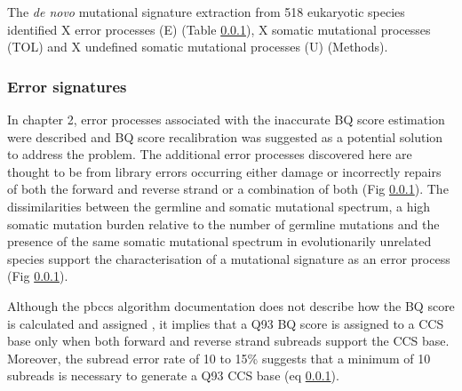 \begin{table}[h!]
\begin{adjustbox}{max width=1.1\textwidth,center}
\begin{tabular}{lllll}
\end{tabular}
\end{adjustbox} 
\end{table}

The \textit{de novo} mutational signature extraction from 518 eukaryotic species identified X error processes (E) (Table \ref{}), X somatic mutational processes (TOL) and X undefined somatic mutational processes (U) (Methods).


\subsubsection{Error signatures}

In chapter 2, error processes associated with the inaccurate BQ score estimation were described and BQ score recalibration was suggested as a potential solution to address the problem. The additional error processes discovered here are thought to be from library errors occurring either damage or incorrectly repairs of both the forward and reverse strand or a combination of both (Fig \ref{}). The dissimilarities between the germline and somatic mutational spectrum, a high somatic mutation burden relative to the number of germline mutations and the presence of the same somatic mutational spectrum in evolutionarily unrelated species support the characterisation of a mutational signature as an error process (Fig \ref{}). 

%

Although the pbccs algorithm documentation does not describe how the BQ score is calculated and assigned \cite{}, it implies that a Q93 BQ score is assigned to a CCS base only when both forward and reverse strand subreads support the CCS base. Moreover, the subread error rate of 10 to 15\% \cite{} suggests that a minimum of 10 subreads is necessary to generate a Q93 CCS base (eq \ref{}). 

